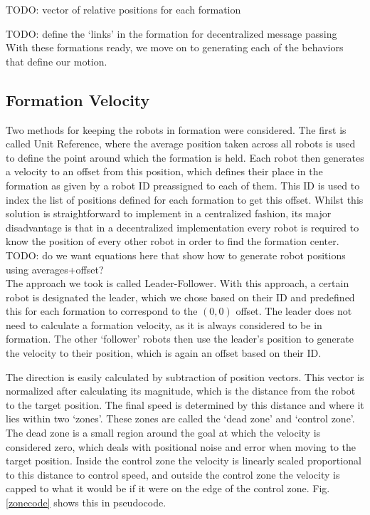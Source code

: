 \documentclass[letterpaper, 10 pt, conference]{ieeeconf}  %
\begin{document}
TODO: vector of relative positions for each formation

TODO: define the `links' in the formation for decentralized message passing \\

With these formations ready, we move on to generating each of the behaviors that define our motion.

\subsection{Formation Velocity}

Two methods for keeping the robots in formation were considered. The first is called Unit Reference, where the average position taken across all robots is used to define the point around which the formation is held. Each robot then generates a velocity to an offset from this position, which defines their place in the formation as given by a robot ID preassigned to each of them. This ID is used to index the list of positions defined for each formation to get this offset. Whilst this solution is straightforward to implement in a centralized fashion, its major disadvantage is that in a decentralized implementation every robot is required to know the position of every other robot in order to find the formation center. \\

TODO: do we want equations here that show how to generate robot positions using averages+offset? \\

The approach we took is called Leader-Follower. With this approach, a certain robot is designated the leader, which we chose based on their ID and predefined this for each formation to correspond to the $(0,0)$ offset. The leader does not need to calculate a formation velocity, as it is always considered to be in formation. The other `follower' robots then use the leader's position to generate the velocity to their position, which is again an offset based on their ID.

The direction is easily calculated by subtraction of position vectors. This vector is normalized after calculating its magnitude, which is the distance from the robot to the target position. The final speed is determined by this distance and where it lies within two `zones'. These zones are called the `dead zone' and `control zone'. The dead zone is a small region around the goal at which the velocity is considered zero, which deals with positional noise and error when moving to the target position. Inside the control zone the velocity is linearly scaled proportional to this distance to control speed, and outside the control zone the velocity is capped to what it would be if it were on the edge of the control zone. Fig. \ref{zonecode} shows this in pseudocode.
\end{document}
